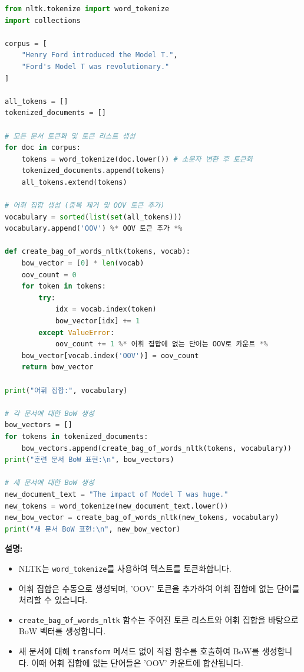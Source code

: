 \documentclass[11pt,a4paper]{article}
\theoremstyle{definition}
\begin{document}
\begin{lstlisting}[language=Python, caption={NLTK를 이용한 BoW 생성}, label=lst:nltk_bow]
from nltk.tokenize import word_tokenize
import collections

corpus = [
    "Henry Ford introduced the Model T.",
    "Ford's Model T was revolutionary."
]

all_tokens = []
tokenized_documents = []

# 모든 문서 토큰화 및 토큰 리스트 생성
for doc in corpus:
    tokens = word_tokenize(doc.lower()) # 소문자 변환 후 토큰화
    tokenized_documents.append(tokens)
    all_tokens.extend(tokens)

# 어휘 집합 생성 (중복 제거 및 OOV 토큰 추가)
vocabulary = sorted(list(set(all_tokens)))
vocabulary.append('OOV') %* OOV 토큰 추가 *%

def create_bag_of_words_nltk(tokens, vocab):
    bow_vector = [0] * len(vocab)
    oov_count = 0
    for token in tokens:
        try:
            idx = vocab.index(token)
            bow_vector[idx] += 1
        except ValueError:
            oov_count += 1 %* 어휘 집합에 없는 단어는 OOV로 카운트 *%
    bow_vector[vocab.index('OOV')] = oov_count
    return bow_vector

print("어휘 집합:", vocabulary)

# 각 문서에 대한 BoW 생성
bow_vectors = []
for tokens in tokenized_documents:
    bow_vectors.append(create_bag_of_words_nltk(tokens, vocabulary))
print("훈련 문서 BoW 표현:\n", bow_vectors)

# 새 문서에 대한 BoW 생성
new_document_text = "The impact of Model T was huge."
new_tokens = word_tokenize(new_document_text.lower())
new_bow_vector = create_bag_of_words_nltk(new_tokens, vocabulary)
print("새 문서 BoW 표현:\n", new_bow_vector)
\end{lstlisting}

\begin{tcolorbox}[examplebox, title=\textbf{예시}]
\textbf{설명:}
\begin{itemize}
    \item NLTK는 \texttt{word\_tokenize}를 사용하여 텍스트를 토큰화합니다.
    \item 어휘 집합은 수동으로 생성되며, 'OOV' 토큰을 추가하여 어휘 집합에 없는 단어를 처리할 수 있습니다.
    \item \texttt{create\_bag\_of\_words\_nltk} 함수는 주어진 토큰 리스트와 어휘 집합을 바탕으로 BoW 벡터를 생성합니다.
    \item 새 문서에 대해 \texttt{transform} 메서드 없이 직접 함수를 호출하여 BoW를 생성합니다. 이때 어휘 집합에 없는 단어들은 'OOV' 카운트에 합산됩니다.
\end{itemize}
\end{tcolorbox}
\end{document}
